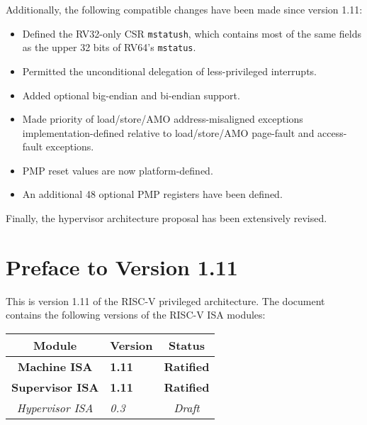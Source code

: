 Additionally, the following compatible changes have been made since version
1.11:
\vspace{-0.2in}
\begin{itemize}
  \parskip 0pt
  \itemsep 1pt
\item Defined the RV32-only CSR {\tt mstatush}, which contains most of the
  same fields as the upper 32 bits of RV64's {\tt mstatus}.
\item Permitted the unconditional delegation of less-privileged interrupts.
\item Added optional big-endian and bi-endian support.
\item Made priority of load/store/AMO address-misaligned exceptions
  implementation-defined relative to load/store/AMO page-fault
  and access-fault exceptions.
\item PMP reset values are now platform-defined.
\item An additional 48 optional PMP registers have been defined.
\end{itemize}

Finally, the hypervisor architecture proposal has been extensively revised.

\newpage

\section*{Preface to Version 1.11}

This is version 1.11 of the RISC-V privileged architecture.
The document contains the following versions of the RISC-V ISA
modules:

{
\begin{table}[hbt]
  \centering
  \begin{tabular}{|c|l|c|}
    \hline
    Module             & Version  & Status\\
    \hline
    \bf Machine ISA    & \bf 1.11 & \bf Ratified \\
    \bf Supervisor ISA & \bf 1.11 & \bf Ratified \\
    \em Hypervisor ISA & \em 0.3  & \em Draft \\
    \hline
  \end{tabular}
\end{table}
}

